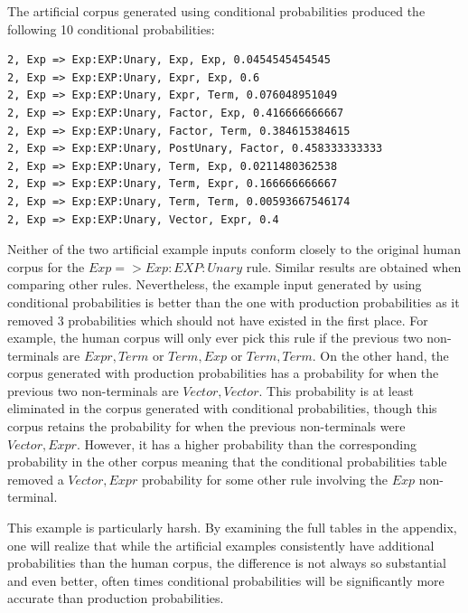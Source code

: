 The artificial corpus generated using conditional probabilities produced the
following 10 conditional probabilities: \\

\noindent
\begin{verbatim}
2, Exp => Exp:EXP:Unary, Exp, Exp, 0.0454545454545
2, Exp => Exp:EXP:Unary, Expr, Exp, 0.6
2, Exp => Exp:EXP:Unary, Expr, Term, 0.076048951049
2, Exp => Exp:EXP:Unary, Factor, Exp, 0.416666666667
2, Exp => Exp:EXP:Unary, Factor, Term, 0.384615384615
2, Exp => Exp:EXP:Unary, PostUnary, Factor, 0.458333333333
2, Exp => Exp:EXP:Unary, Term, Exp, 0.0211480362538
2, Exp => Exp:EXP:Unary, Term, Expr, 0.166666666667
2, Exp => Exp:EXP:Unary, Term, Term, 0.00593667546174
2, Exp => Exp:EXP:Unary, Vector, Expr, 0.4
\end{verbatim}

Neither of the two artificial example inputs conform closely to the
original human corpus for the $Exp => Exp:EXP:Unary$ rule. Similar results are
obtained when comparing other rules. Nevertheless, the example input generated
by using conditional probabilities is better than the one with production
probabilities as it removed 3 probabilities which should not have existed in
the first place. For example, the human corpus will only ever pick this rule if
the previous two non-terminals are $Expr, Term$ or $Term, Exp$ or $Term, Term$.
On the other hand, the corpus generated with production probabilities has a
probability for when the previous two non-terminals are $Vector, Vector$. This
probability is at least eliminated in the corpus generated with conditional
probabilities, though this corpus retains the probability for when the previous
non-terminals were $Vector, Expr$. However, it has a higher probability
than the corresponding probability in the other corpus meaning that the
conditional probabilities table removed a $Vector, Expr$ probability for some
other rule involving the $Exp$ non-terminal.

This example is particularly harsh. By examining the full tables in the
appendix, one will realize that while the artificial examples consistently
have additional probabilities than the human corpus, the difference is not
always so substantial and even better, often times conditional probabilities
will be significantly more accurate than production probabilities.

